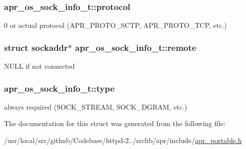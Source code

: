\subsubsection[{\texorpdfstring{protocol}{protocol}}]{ apr\+\_\+os\+\_\+sock\+\_\+info\+\_\+t\+::protocol}\hypertarget{structapr__os__sock__info__t_a176ede3ecf40abf0f82a01bfeb95f1e3}{}\label{structapr__os__sock__info__t_a176ede3ecf40abf0f82a01bfeb95f1e3}
0 or actual protocol (A\+P\+R\+\_\+\+P\+R\+O\+T\+O\+\_\+\+S\+C\+TP, A\+P\+R\+\_\+\+P\+R\+O\+T\+O\+\_\+\+T\+CP, etc.) 
\subsubsection[{\texorpdfstring{remote}{remote}}]{\setlength{\rightskip}{0pt plus 5cm}struct {\bf sockaddr}$\ast$ apr\+\_\+os\+\_\+sock\+\_\+info\+\_\+t\+::remote}\hypertarget{structapr__os__sock__info__t_ae71fe14a5eb9141fc4ad0a6d0a91f17e}{}\label{structapr__os__sock__info__t_ae71fe14a5eb9141fc4ad0a6d0a91f17e}
N\+U\+LL if not connected 
\subsubsection[{\texorpdfstring{type}{type}}]{ apr\+\_\+os\+\_\+sock\+\_\+info\+\_\+t\+::type}\hypertarget{structapr__os__sock__info__t_a248fb394cd644b31619f44de0936aa04}{}\label{structapr__os__sock__info__t_a248fb394cd644b31619f44de0936aa04}
always required (S\+O\+C\+K\+\_\+\+S\+T\+R\+E\+AM, S\+O\+C\+K\+\_\+\+D\+G\+R\+AM, etc.) 

The documentation for this struct was generated from the following file\+:\begin{DoxyCompactItemize}
\item 
/usr/local/src/github/\+Codebase/httpd-\/2../srclib/apr/include/\hyperlink{apr__portable_8h}{apr\+\_\+portable.\+h}\end{DoxyCompactItemize}
